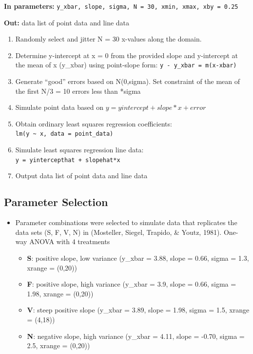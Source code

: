 \documentclass[print]{nuthesis}
\providecommand{\tightlist}{%
  \setlength{\itemsep}{0pt}\setlength{\parskip}{0pt}}
\begin{document}
\textbf{In parameters:} \texttt{y\_xbar,\ slope,\ sigma,\ N\ =\ 30,\ xmin,\ xmax,\ xby\ =\ 0.25}

\textbf{Out:} data list of point data and line data

\begin{enumerate}
\def\labelenumi{\arabic{enumi}.}
\tightlist
\item
  Randomly select and jitter N = 30 x-values along the domain.
\item
  Determine y-intercept at x = 0 from the provided slope and y-intercept at the mean of x (y\_xbar) using point-slope form: \texttt{y\ -\ y\_xbar\ =\ m(x-xbar)}
\item
  Generate ``good'' errors based on N(0,sigma). Set constraint of the mean of the first N/3 = 10 errors less than *sigma\textbar{}
\item
  Simulate point data based on \(y = yintercept + slope*x + error\)
\item
  Obtain ordinary least squares regression coefficients: \texttt{lm(y\ \textasciitilde{}\ x,\ data\ =\ point\_data)}
\item
  Simulate least squares regression line data: \texttt{y\ =\ yintercepthat\ +\ slopehat*x}
\item
  Output data list of point data and line data
\end{enumerate}

\hypertarget{parameter-selection-1}{%
\subsection{Parameter Selection}\label{parameter-selection-1}}

\begin{itemize}
\tightlist
\item
  Parameter combinations were selected to simulate data that replicates the data sets (S, F, V, N) in (Mosteller, Siegel, Trapido, \& Youtz, 1981). One-way ANOVA with 4 treatments

  \begin{itemize}
  \tightlist
  \item
    \textbf{S}: positive slope, low variance (y\_xbar = 3.88, slope = 0.66, sigma = 1.3, xrange = (0,20))
  \item
    \textbf{F}: positive slope, high variance (y\_xbar = 3.9, slope = 0.66, sigma = 1.98, xrange = (0,20))
  \item
    \textbf{V}: steep positive slope (y\_xbar = 3.89, slope = 1.98, sigma = 1.5, xrange = (4,18))
  \item
    \textbf{N}: negative slope, high variance (y\_xbar = 4.11, slope = -0.70, sigma = 2.5, xrange = (0,20))
  \end{itemize}
\end{itemize}
\end{document}
